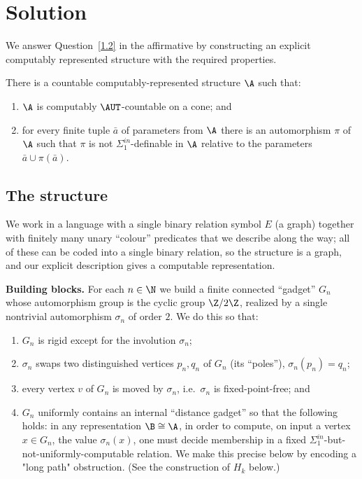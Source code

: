 \section{Solution}

We answer Question~\ref{1.2} in the affirmative by constructing an explicit
computably represented structure with the required properties.

\begin{theorem}\label{main}
There is a countable computably-represented structure $\A$ such that:
\begin{enumerate}
\item[(a)] $\A$ is computably $\AUT$-countable on a cone; and
\item[(b)] for every finite tuple $\bar a$ of parameters from $\A$ there is an
automorphism $\pi$ of $\A$ such that $\pi$ is not $\Sigma^{in}_1$-definable in
$\A$ relative to the parameters $\bar a\cup\pi(\bar a)$.
\end{enumerate}
\end{theorem}

\subsection{The structure}

We work in a language with a single binary relation symbol $E$ (a graph) together
with finitely many unary ``colour'' predicates that we describe along the way; all
of these can be coded into a single binary relation, so the structure is a graph,
and our explicit description gives a computable representation.

\medskip

\noindent\textbf{Building blocks.}
For each $n\in\N$ we build a finite connected ``gadget'' $G_n$ whose automorphism
group is the cyclic group $\Z/2\Z$, realized by a single nontrivial automorphism
$\sigma_n$ of order $2$. We do this so that:
\begin{enumerate}
\item[(i)] $G_n$ is rigid except for the involution $\sigma_n$;
\item[(ii)] $\sigma_n$ swaps two distinguished vertices $p_n,q_n$ of $G_n$
(its ``poles''), $\sigma_n(p_n)=q_n$;
\item[(iii)] every vertex $v$ of $G_n$ is moved by $\sigma_n$, i.e.\ $\sigma_n$ is
fixed-point-free; and
\item[(iv)] $G_n$ uniformly contains an internal ``distance gadget'' so that the
following holds: in any representation $\B\cong\A$, in order to compute, on input a
vertex $x\in G_n$, the value $\sigma_n(x)$, one must decide membership in a fixed
$\Sigma^{in}_1$-but-not-uniformly-computable relation. We make this precise below
by encoding a "long path" obstruction. (See the construction of $H_k$ below.)
\end{enumerate}

